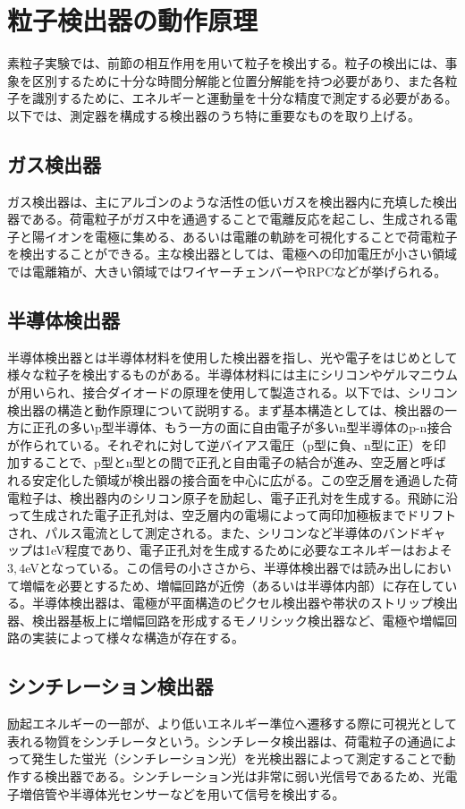 \section{粒子検出器の動作原理}
 素粒子実験では、前節の相互作用を用いて粒子を検出する。粒子の検出には、事象を区別するために十分な時間分解能と位置分解能を持つ必要があり、また各粒子を識別するために、エネルギーと運動量を十分な精度で測定する必要がある。以下では、測定器を構成する検出器のうち特に重要なものを取り上げる。

\subsection{ガス検出器}
 ガス検出器は、主にアルゴンのような活性の低いガスを検出器内に充填した検出器である。荷電粒子がガス中を通過することで電離反応を起こし、生成される電子と陽イオンを電極に集める、あるいは電離の軌跡を可視化することで荷電粒子を検出することができる。主な検出器としては、電極への印加電圧が小さい領域では電離箱が、大きい領域ではワイヤーチェンバーやRPCなどが挙げられる。

\subsection{半導体検出器}
 半導体検出器とは半導体材料を使用した検出器を指し、光や電子をはじめとして様々な粒子を検出するものがある。半導体材料には主にシリコンやゲルマニウムが用いられ、接合ダイオードの原理を使用して製造される。以下では、シリコン検出器の構造と動作原理について説明する。まず基本構造としては、検出器の一方に正孔の多いp型半導体、もう一方の面に自由電子が多いn型半導体のp-n接合が作られている。それぞれに対して逆バイアス電圧（p型に負、n型に正）を印加することで、p型とn型との間で正孔と自由電子の結合が進み、空乏層と呼ばれる安定化した領域が検出器の接合面を中心に広がる。この空乏層を通過した荷電粒子は、検出器内のシリコン原子を励起し、電子正孔対を生成する。飛跡に沿って生成された電子正孔対は、空乏層内の電場によって両印加極板までドリフトされ、パルス電流として測定される。また、シリコンなど半導体のバンドギャップは1eV程度であり、電子正孔対を生成するために必要なエネルギーはおよそ$3,4$eVとなっている。この信号の小ささから、半導体検出器では読み出しにおいて増幅を必要とするため、増幅回路が近傍（あるいは半導体内部）に存在している。半導体検出器は、電極が平面構造のピクセル検出器や帯状のストリップ検出器、検出器基板上に増幅回路を形成するモノリシック検出器など、電極や増幅回路の実装によって様々な構造が存在する。

\subsection{シンチレーション検出器}
 励起エネルギーの一部が、より低いエネルギー準位へ遷移する際に可視光として表れる物質をシンチレータという。シンチレータ検出器は、荷電粒子の通過によって発生した蛍光（シンチレーション光）を光検出器によって測定することで動作する検出器である。シンチレーション光は非常に弱い光信号であるため、光電子増倍管や半導体光センサーなどを用いて信号を検出する。
 
